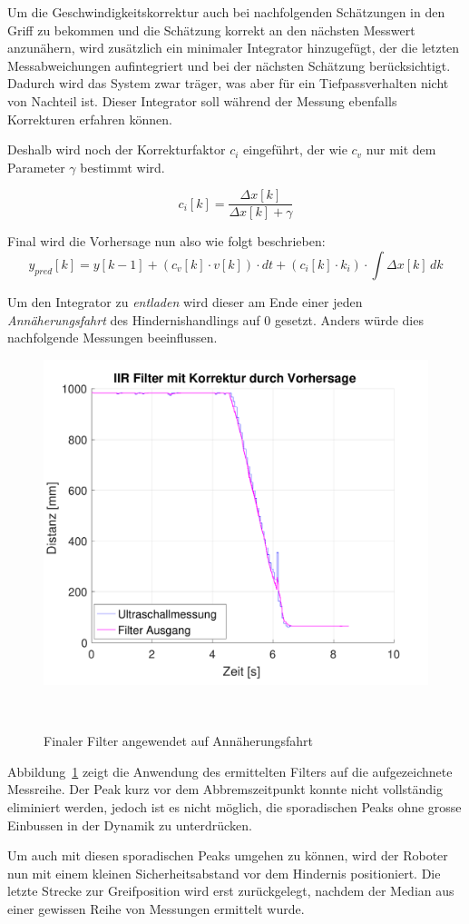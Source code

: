 \documentclass[main.tex]{subfiles} %
\begin{document}
Um die Geschwindigkeitskorrektur auch bei nachfolgenden Schätzungen in den
Griff zu bekommen und die Schätzung korrekt an den nächsten Messwert
anzunähern, wird zusätzlich ein minimaler Integrator hinzugefügt, der die
letzten Messabweichungen aufintegriert und bei der nächsten Schätzung
berücksichtigt. Dadurch wird das System zwar träger, was aber für ein
Tiefpassverhalten nicht von Nachteil ist. Dieser Integrator soll während der
Messung ebenfalls Korrekturen erfahren können.

Deshalb wird noch der Korrekturfaktor $c_i$ eingeführt, der wie $c_v$ nur mit
dem Parameter $\gamma$ bestimmt wird.

\[
    c_i[k] = \frac{\Delta x[k]}{\Delta x[k] + \gamma}
\]

Final wird die Vorhersage nun also wie folgt beschrieben:
\[
    y_{pred}[k] = y[k - 1] + (c_v[k] \cdot v[k]) \cdot dt + (c_i[k] \cdot k_i) \cdot \int \Delta x[k]\,dk
\]

Um den Integrator zu \textit{entladen} wird dieser am Ende einer jeden
\textit{Annäherungsfahrt} des Hindernishandlings auf 0 gesetzt. Anders würde
dies nachfolgende Messungen beeinflussen.

\begin{figure}[H]
    \centering
    \includegraphics[width=0.5\linewidth]{./fig_Parametrierung_HcSr04/Einfacher_Tiefpass_HcSr04_V_Korrigiert.pdf}
    \caption{Finaler Filter angewendet auf Annäherungsfahrt}~\label{fig:EinfacherTiefpassHcSr04_V_Korrigiert}
\end{figure}

Abbildung~\ref{fig:EinfacherTiefpassHcSr04_V_Korrigiert} zeigt die Anwendung
des ermittelten Filters auf die aufgezeichnete Messreihe. Der Peak kurz vor dem
Abbremszeitpunkt konnte nicht vollständig eliminiert werden, jedoch ist es
nicht möglich, die sporadischen Peaks ohne grosse Einbussen in der Dynamik zu
unterdrücken.

Um auch mit diesen sporadischen Peaks umgehen zu können, wird der Roboter nun
mit einem kleinen Sicherheitsabstand vor dem Hindernis positioniert. Die letzte
Strecke zur Greifposition wird erst zurückgelegt, nachdem der Median aus einer
gewissen Reihe von Messungen ermittelt wurde.
\end{document}
